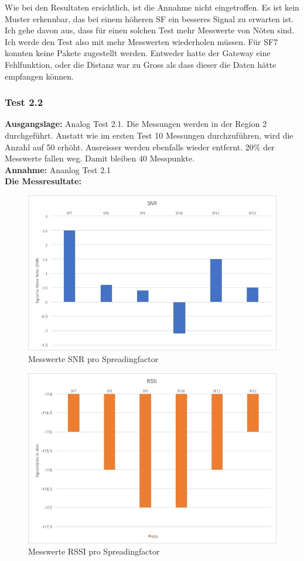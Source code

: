 \documentclass[11pt,english,german]{report}
\theoremstyle{definition}
\begin{document}
Wie bei den Resultaten ersichtlich, ist die Annahme nicht eingetroffen. Es ist kein Muster erkennbar, das bei einem höheren SF ein besseres Signal zu erwarten ist. Ich gehe davon aus, dass für einen solchen Test mehr Messwerte von Nöten sind. Ich werde den Test also mit mehr Messwerten wiederholen müssen. Für SF7 konnten keine Pakete zugestellt werden. Entweder hatte der Gateway eine Fehlfunktion, oder die Distanz war zu Gross als dass dieser die Daten hätte empfangen können.
\newpage
\subsubsection{Test 2.2}
\textbf{Ausgangslage:} Analog Test 2.1. Die Messungen werden in der Region 2 durchgeführt. Anstatt wie im ersten Test 10 Messungen durchzuführen, wird die Anzahl auf 50 erhöht. Ausreisser werden ebenfalls wieder entfernt. 20\% der Messwerte fallen weg. Damit bleiben 40 Messpunkte.\\[0.3cm]
\textbf{Annahme:} Ananlog Test 2.1\\[0.3cm]
\textbf{Die Messresultate:}
\begin{figure}[H]
	\centering
	\includegraphics[width=\textwidth]{img/testing/testing2_sf_snr.jpg}
	\caption[Messwerte SNR  pro Spreadingfactor]
	{Messwerte SNR pro Spreadingfactor}
\end{figure}
\begin{figure}[H]
	\centering
	\includegraphics[width=\textwidth]{img/testing/testing2_sf_rssi.jpg}
	\caption[Messwerte RSSI pro Spreadingfactor]
	{Messwerte RSSI pro Spreadingfactor}
\end{figure}%
\end{document}
